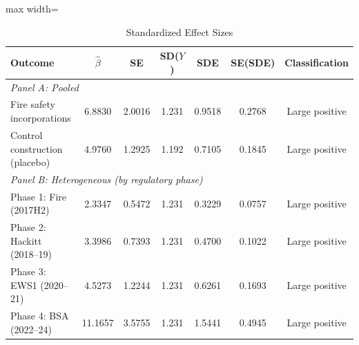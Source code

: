 \begin{table}[htbp]
\centering
\caption{Standardized Effect Sizes}
\label{tab:sde}
\begin{adjustbox}{max width=\textwidth}
\begin{tabular}{lcccccc}
\hline\hline
Outcome & $\hat{\beta}$ & SE & SD($Y$) & SDE & SE(SDE) & Classification \\
\hline
\multicolumn{7}{l}{\textit{Panel A: Pooled}} \\
Fire safety incorporations & 6.8830 & 2.0016 & 1.231 & 0.9518 & 0.2768 & Large positive \\
Control construction (placebo) & 4.9760 & 1.2925 & 1.192 & 0.7105 & 0.1845 & Large positive \\
\hline
\multicolumn{7}{l}{\textit{Panel B: Heterogeneous (by regulatory phase)}} \\
Phase 1: Fire (2017H2) & 2.3347 & 0.5472 & 1.231 & 0.3229 & 0.0757 & Large positive \\
Phase 2: Hackitt (2018--19) & 3.3986 & 0.7393 & 1.231 & 0.4700 & 0.1022 & Large positive \\
Phase 3: EWS1 (2020--21) & 4.5273 & 1.2244 & 1.231 & 0.6261 & 0.1693 & Large positive \\
Phase 4: BSA (2022--24) & 11.1657 & 3.5755 & 1.231 & 1.5441 & 0.4945 & Large positive \\
\hline\hline
\end{tabular}
\end{adjustbox}
\begin{tablenotes}[flushleft]
\small

\end{tablenotes}
\end{table}
